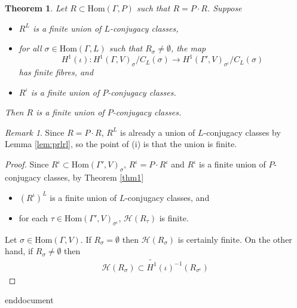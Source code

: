 \documentclass[12pt, a4paper]{amsart}
\numberwithin{equation}{section}
\newtheorem{thm}[equation]{Theorem}
\theoremstyle{definition}
\theoremstyle{remark}
\newtheorem{rem}[equation]{Remark}
\theoremstyle{remark}
\begin{document}
\begin{thm}
Let $R \subset \mathrm{Hom}(\Gamma, P)$ such that $R = P \cdot R$. Suppose
\begin{itemize}
\item[(i)] $R^L$ is a finite union of $L$-conjugacy classes,
\item[(ii)] for all $\sigma \in \mathrm{Hom}(\Gamma, L)$ such that $R_\sigma \neq \emptyset$, the map \begin{displaymath}H^1(\iota):H^1(\Gamma, V)_\sigma/C_L(\sigma) \rightarrow H^1(\Gamma', V)_{\sigma^\iota}/C_L(\sigma)\end{displaymath} has finite fibres, and
\item[(iii)] $R^\iota$ is a finite union of $P$-conjugacy classes.
\end{itemize}
Then $R$ is a finite union of $P$-conjugacy classes.
\end{thm}
\begin{rem} Since $R = P \cdot R$, $R^L$ is already a union of $L$-conjugacy classes by Lemma \ref{lem:prlrl}, so the point of (i) is that the union is finite. \end{rem}
\begin{proof}
Since $R^\iota \subset \mathrm{Hom}(\Gamma', V)_\sigma$, $R^\iota = P \cdot R^\iota$ and $R^\iota$ is a finite union of $P$-conjugacy classes, by Theorem \ref{thm1}
\begin{itemize}
\item[(iv)] $(R^\iota)^L$ is a finite union of $L$-conjugacy classes, and
\item[(v)] for each $\tau \in \mathrm{Hom}(\Gamma', V)_{\sigma^\iota}$, $\mathcal{H}(R_\tau)$ is finite.
\end{itemize}
Let $\sigma \in \mathrm{Hom}(\Gamma, V)$. If $R_\sigma = \emptyset$ then $\mathcal{H}(R_\sigma)$ is certainly finite. On the other hand, if $R_\sigma \neq \emptyset$ then
\begin{eqnarray} \mathcal{H}(R_\sigma) \subset \widetilde{H^1}(\iota)^{-1}(R_{\sigma^\iota}) \end{eqnarray}
\end{proof}

end{document}
\end{document}
